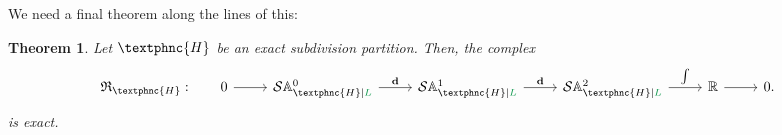 \documentclass[12pt, a4paper]{article}
\newcommand{\green}{\color{ForestGreen}}
\renewcommand{\L}{{\green L}}
\newcommand{\extd}{\mathbf{d}}
\newcommand{\heth}{\textphnc{H}}
\newcommand{\C}{\heth}
\newcommand{\activeDoFs}{\mathbb{A}}
\newcommand{\hierSDFspace}[3]{\mathcal{S}\activeDoFs^{#1}_{#2 \vert #3}}
\newtheorem{theorem}{Theorem}[section]
\numberwithin{equation}{section}
\begin{document}
We need a final theorem along the lines of this:
\begin{theorem}
    Let $\C$ be an exact subdivision partition. Then, the complex
    \begin{equation}
    \begin{tikzcd}
        \mathfrak{R}_\C: \qquad 0 \arrow[r] & \hierSDFspace{0}{\C}{\L} \arrow[r, "\extd"] & \hierSDFspace{1}{\C}{\L} \arrow[r, "\extd"] & \hierSDFspace{2}{\C}{\L} \arrow[r, "\int"] & \mathbb{R} \arrow[r] & 0.
    \end{tikzcd}
    \end{equation}
    is exact.
\end{theorem}


\end{document}

